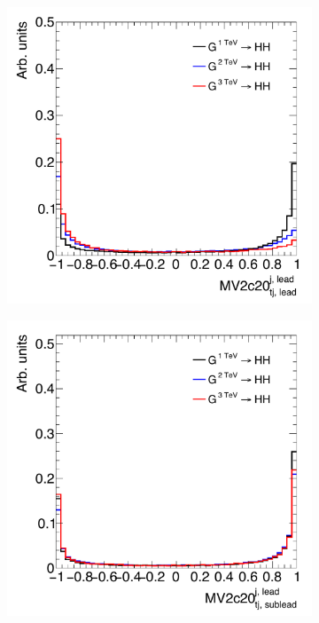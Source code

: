 \begin{figure}[h!]
  \centering
  \captionsetup{justification=centering}

   \begin{subfigure}[t]{0.5\textwidth}
        \centering
        \includegraphics[width=\textwidth]{figures/LeadTrackJet_MV2c20}
        \caption{}
    \end{subfigure}%
    \begin{subfigure}[t]{0.5\textwidth}
        \centering
        \includegraphics[width=\textwidth]{figures/SubleadTrackJet_MV2c20}
        \caption{}
    \end{subfigure}


\end{figure}
